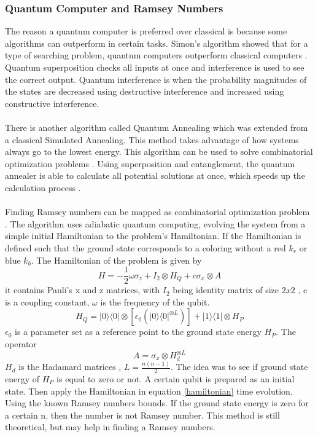 \documentclass{Assignment}
\begin{document}
\subsubsection*{Quantum Computer and Ramsey Numbers}
The reason a quantum computer is preferred over classical is because some algorithms can outperform in certain tasks. 
Simon's algorithm showed that for a type of searching problem, quantum computers outperform classical computers \cite{doi:10.1137/S0097539796298637}.
Quantum superposition checks all inputs at once and interference is used to see the correct output.
Quantum interference is when the probability magnitudes of the states are decreased using destructive interference and increased using constructive interference.
\\\\
There is another algorithm called Quantum Annealing which was extended from a classical Simulated Annealing.
This method takes advantage of how systems always go to the lowest energy.
This algorithm can be used to solve combinatorial optimization problems \cite{AndrewSteane}.
Using superposition and entanglement, the quantum annealer is able to calculate all potential solutions at once, which speeds up the 
calculation process \cite{AndrewSteane}.
\\\\
Finding Ramsey numbers can be mapped as combinatorial optimization problem \cite{PhysRevA.93.032301}.
The algorithm uses adiabatic quantum computing, evolving the system from a simple initial Hamiltonian to the problem's Hamiltonian.
If the Hamiltonian is defined such that the ground state corresponds to a coloring without a red $k_r$ or blue $k_b$.
The Hamiltonian of the problem is given by
\begin{equation}
	H = -\frac{1}{2}\omega \sigma_z + I_2 \otimes H_Q+c\sigma_x\otimes A
	\label{hamiltonian}
\end{equation}
it contains Pauli's x and z matrices, with $I_2$ being identity matrix of size $2 x 2$ , c is a coupling constant, $\omega$ is the frequency of the qubit.
$$H_Q =|0\rangle\langle0|\otimes[\epsilon_0(|0\rangle\langle0|^{\otimes L})] + |1\rangle\langle 1|\otimes H_P$$
$\epsilon_0$ is a parameter set as a reference point to the ground state energy $H_P$.
The operator $$A = \sigma_x \otimes H_d^{\otimes L}$$
$H_d$ is the Hadamard matrices , $L = \frac{n(n-1)}{2}$.
The idea was to see if ground state energy of $H_P$ is equal to zero or not.
A certain qubit is prepared as an initial state.
Then apply the Hamiltonian in equation \eqref{hamiltonian} time evolution. 
Using the known Ramsey numbers bounds.
If the ground state energy is zero for a certain n, then the number is not Ramsey number. 
This method is still theoretical, but may help in finding a Ramsey numbers.
\\\\
\end{document}
